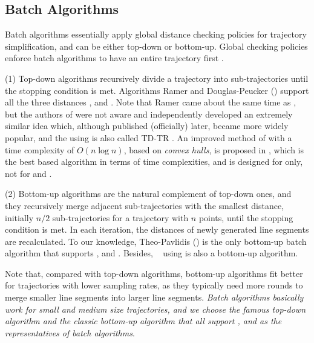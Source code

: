 \subsection{Batch Algorithms}
Batch algorithms essentially apply global distance checking policies for trajectory simplification, and can be either top-down or bottom-up.
Global checking policies enforce batch algorithms to have an entire trajectory first \cite{Meratnia:Spatiotemporal}.

(1) Top-down algorithms recursively divide a trajectory into sub-trajectories until the stopping condition is met.
Algorithms Ramer \cite{Ramer:Split} and Douglas-Peucker (\dpa)  \cite{Douglas:Peucker} support all the three distances \ped, \sed and \dad. {Note that {Ramer came about the same time as \dpa, but the authors of \dpa were not aware and independently developed an extremely similar idea which, although published (officially) later, became more widely popular, and} the \dpa using \sed is also called TD-TR \cite{Meratnia:Spatiotemporal}}.
An improved method of \dpa with a time complexity of $O(n\log n)$, based on \emph{convex hulls}, is proposed in \cite{Hershberger:Speeding}, which is the best \dpa based  algorithm in terms of time complexities, and is designed for \ped only, not for \sed and \dad.



(2) Bottom-up algorithms are the natural complement of top-down ones, and they recursively merge adjacent sub-trajectories with the smallest distance, initially $n/2$  sub-trajectories for a trajectory with $n$ points, until the stopping condition is met. In each iteration, the distances of newly generated line segments are recalculated.
To our knowledge, Theo-Pavlidis (\tpa) \cite{Pavlidis:Segment} is the only bottom-up batch \lsa algorithm that supports \ped, \sed and \dad. {Besides, \bumr~\cite{Chen:Fast} using \lissed is also a bottom-up algorithm.}

Note that, compared with top-down algorithms, bottom-up algorithms fit better for trajectories with lower sampling rates, as they typically need more rounds to merge smaller line segments into larger line segments. {\em Batch algorithms basically work for small and medium size trajectories, and we choose {the famous top-down algorithm} \dpa and {the classic bottom-up algorithm} \tpa that all support \ped, \sed and \dad  as the representatives of batch \lsa algorithms}.


